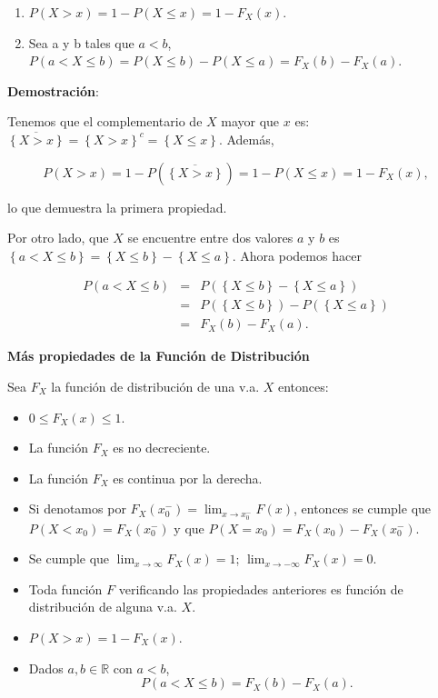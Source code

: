 \documentclass[]{book}
\providecommand{\tightlist}{%
  \setlength{\itemsep}{0pt}\setlength{\parskip}{0pt}}
\begin{document}
\begin{enumerate}
\def\labelenumi{\arabic{enumi}.}
\tightlist
\item
  \(P(X>x)=1-P(X\leq x)=1-F_{X}(x).\)
\item
  Sea a y b tales que \(a<b\), \(P(a<X\leq b)=P(X\leq b)-P(X\leq a)=F_{X}(b)-F_{X}(a).\)
\end{enumerate}

\textbf{Demostración}:

Tenemos que el complementario de \(X\) mayor que \(x\) es: \(\overline{\left\{X>x\right\}}=\left\{X>x\right\}^c=\left\{X\leq x\right\}\). Además,

\[P(X>x)=1-P(\overline{\left\{X>x\right\}})=1-P(X\leq x)=1-F_{X}(x),\]

lo que demuestra la primera propiedad.

Por otro lado, que \(X\) se encuentre entre dos valores \(a\) y \(b\) es \(\left\{a< X \leq b\right\}= \left\{X\leq b\right\}-\left\{X\leq a\right\}\). Ahora podemos hacer

\begin{eqnarray*}
P(a<X\leq b)&=&P(\left\{X\leq b\right\}-\left\{X\leq a\right\})\\
&=& P(\left\{X\leq b\right\})-P(\left\{X\leq a\right\})\\
&=& F_{X}(b)-F_{X}(a).
\end{eqnarray*}

\textbf{Más propiedades de la Función de Distribución}

Sea \(F_{X}\) la función de distribución de una v.a. \(X\) entonces:

\begin{itemize}
\tightlist
\item
  \(0\leq F_{X}(x)\leq 1\).
\item
  La función \(F_{X}\) es no decreciente.
\item
  La función \(F_{X}\) es continua por la derecha.
\item
  Si denotamos por \(F_X(x_0^{-})=\displaystyle \lim_{x\to x_0^{-}} F(x)\),
  entonces se cumple que \(P(X< x_0)=F_X(x_0^{-})\) y que \(P(X=x_0)=F_X(x_0)-F_X(x_0^{-})\).
\item
  Se cumple que \(\displaystyle \lim_{x\to\infty} F_{X}(x)=1\); \(\displaystyle \lim_{x\to-\infty}F_{X}(x)=0\).
\item
  Toda función \(F\) verificando las propiedades anteriores es función de distribución de alguna v.a. \(X\).
\item
  \(P(X>x)=1-F_{X}(x)\).
\item
  Dados \(a,b\in \mathbb{R}\) con \(a<b\), \[P(a<X\leq b)=F_{X}(b)-F_{X}(a).\]
\end{itemize}
\end{document}
